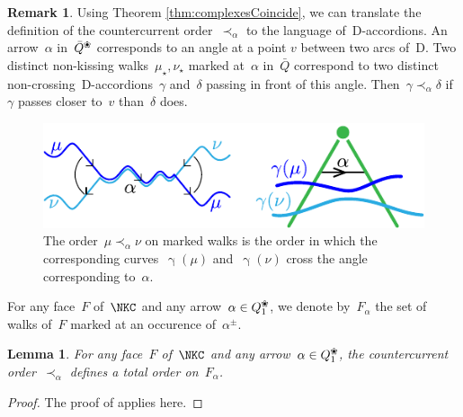 \documentclass{amsart}
\newtheorem{lemma}[theorem]{Lemma}
\theoremstyle{definition}
\newtheorem{remark}[theorem]{Remark}
\newcommand{\blossom}{^\text{\ding{96}}} %
\newcommand{\dissection}{\mathrm{D}} %
\newcommand{\curveof}{\operatorname{\gamma}} %
\begin{document}
\begin{remark}
\label{rema:countercurrentOrderOnSurface}
Using Theorem \ref{thm:complexesCoincide}, we can translate the definition of the countercurrent order~$\prec_\alpha$ to the language of~$\dissection$-accordions.
An arrow~$\alpha$ in~$\bar Q\blossom$ corresponds to an angle at a point $v$ between two arcs of~$\dissection$.
Two distinct non-kissing walks~$\mu_\star, \nu_\star$ marked at~$\alpha$ in~$\bar Q$ correspond to two distinct non-crossing~$\dissection$-accordions~$\gamma$ and~$\delta$ passing in front of this angle.
Then~$\gamma \prec_\alpha \delta$ if~$\gamma$ passes closer to~$v$ than~$\delta$ does.
%
\begin{figure}[h]
	\capstart
	\centerline{\includegraphics[scale=1]{orderCurves}}
	\caption{The order~$\mu \prec_\alpha \nu$ on marked walks is the order in which the corresponding curves~$\curveof(\mu)$ and~$\curveof(\nu)$ cross the angle corresponding to~$\alpha$.}
	\label{fig:orderCurves}
\end{figure}
\end{remark}


For any face~$F$ of~$\NKC$ and any arrow~$\alpha\in Q_1\blossom$, we denote by~$F_\alpha$ the set of walks of~$F$ marked at an occurence of~$\alpha^\pm$.

\begin{lemma}
\label{lemm:countercurrentOrderIsTotal}
For any face~$F$ of~$\NKC$ and any arrow~$\alpha\in Q_1\blossom$, the countercurrent order~$\prec_\alpha$ defines a total order on~$F_{\alpha}$.
\end{lemma}
\begin{proof}
 The proof of \cite[Lem.~2.21]{PaluPilaudPlamondon} applies here.
\end{proof}
\end{document}
